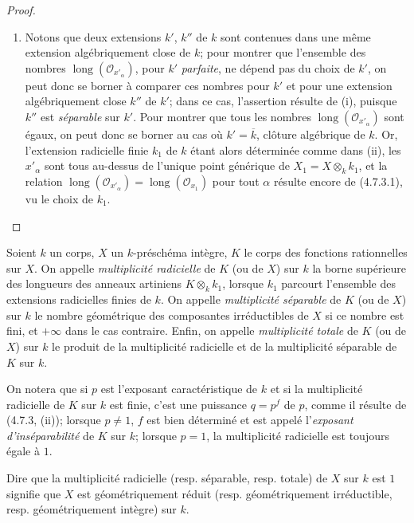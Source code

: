\begin{proof}
\begin{enumerate}
\item[(iii)] Notons que deux extensions $k'$, $k''$ de $k$ sont contenues
dans une même extension algébriquement close de $k$; pour montrer que
l'ensemble des nombres $\operatorname{long}(\mathcal O_{x'_\alpha})$, pour
$k'$ \emph{parfaite}, ne dépend pas du choix de $k'$, on peut donc se borner à
comparer ces nombres pour $k'$ et pour une extension algébriquement close
$k''$ de $k'$; dans ce cas, l'assertion résulte de (i), puisque $k''$ est
\emph{séparable} sur $k'$. Pour montrer que tous les nombres
$\operatorname{long}(\mathcal O_{x'_\alpha})$ sont égaux, on peut donc se
borner au cas où $k'=\overline k$, clôture algébrique de $k$. Or, l'extension
radicielle finie $k_1$ de $k$ étant alors déterminée comme dans (ii), les
$x'_\alpha$ sont tous au-dessus de l'unique point générique de
$X_1=X\otimes_k k_1$, et la relation
$\operatorname{long}(\mathcal O_{x'_\alpha})=
\operatorname{long}(\mathcal O_{x_1})$ pour tout $\alpha$ résulte encore de
(4.7.3.1), vu le choix de $k_1$.
\end{enumerate}
\end{proof}

\begin{definition}[4.7.4]
\label{IV.2.4.7.4-fr}
Soient $k$ un corps, $X$ un $k$-préschéma intègre, $K$ le corps des fonctions
rationnelles sur $X$. On appelle \emph{multiplicité radicielle} de $K$ (ou de
$X$) sur $k$ la borne supérieure des longueurs des anneaux artiniens
$K\otimes_k k_1$, lorsque $k_1$ parcourt l'ensemble des extensions
radicielles finies de $k$. On appelle \emph{multiplicité séparable} de $K$ (ou
de $X$) sur $k$ le nombre géométrique des composantes irréductibles de $X$ si
ce nombre est fini, et $+\infty$ dans le cas contraire. Enfin, on appelle
\emph{multiplicité totale} de $K$ (ou de $X$) sur $k$ le produit de la
multiplicité radicielle et de la multiplicité séparable de $K$ sur $k$.
\end{definition}

On notera que si $p$ est l'exposant caractéristique de $k$ et si la
multiplicité radicielle de $K$ sur $k$ est finie, c'est une puissance $q=p^f$
de $p$, comme il résulte de (4.7.3, (ii)); lorsque $p\ne1$, $f$ est bien
déterminé et est appelé l'\emph{exposant d'inséparabilité} de $K$ sur $k$;
lorsque $p=1$, la multiplicité radicielle est toujours égale à $1$.

Dire que la multiplicité radicielle (resp. séparable, resp. totale) de $X$ sur
$k$ est $1$ signifie que $X$ est géométriquement réduit (resp.
géométriquement irréductible, resp. géométriquement intègre) sur $k$.

